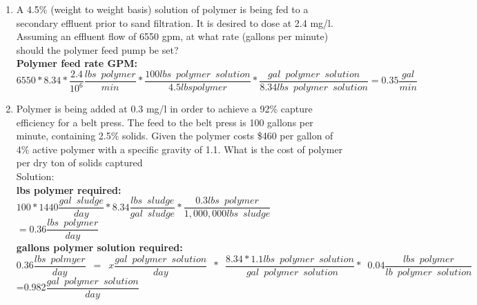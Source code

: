 \begin{enumerate}
\item A 4.5\% (weight to weight basis) solution of polymer is being fed to a secondary effluent prior to sand filtration. It is desired to dose at 2.4 mg/l. Assuming an effluent flow of 6550 gpm, at what rate (gallons per minute) should the polymer feed pump be set?\\
\vspace{0.25cm}
\textbf{Polymer feed rate GPM:}\\
$6550*8.34*\dfrac{2.4}{10^6}\dfrac{lbs \enspace polymer}{min}*
\dfrac{100lbs \enspace polymer \enspace solution}{4.5 lbs polymer}*
\dfrac{gal \enspace polymer \enspace solution}{8.34 lbs \enspace polymer \enspace solution}=\boxed{0.35\dfrac{gal}{min}}$
\pagebreak
\item Polymer is being added at 0.3 mg/l in order to achieve a 92\% capture efficiency for a belt press. The feed to the belt press is 100 gallons per minute, containing 2.5\% solids. Given the polymer costs \$460 per gallon of 4\% active polymer with a specific gravity of 1.1. What is the cost of polymer per dry ton of solids captured \\

Solution:\\
\textbf{lbs polymer required:}\\
$100*1440 \dfrac{gal \enspace sludge}{day}* 8.34 \dfrac{lbs \enspace sludge}{gal \enspace sludge} *\dfrac{0.3lbs \enspace polymer}{1,000,000 lbs \enspace sludge}$\\
\vspace{0.25cm}
$= 0.36 \dfrac{lbs \enspace polymer}{day}$\\

\vspace{0.25cm}
\textbf{gallons polymer solution required:}\\ $0.36 \dfrac{lbs \enspace polmyer}{day}\enspace=\enspace x \dfrac{gal \enspace polymer \enspace solution}{day} \enspace * \enspace \dfrac{8.34*1.1lbs \enspace polymer \enspace solution}{\enspace gal \enspace polymer \enspace solution}* \enspace 0.04 \dfrac{lbs \enspace polymer}{lb \enspace polymer \enspace solution}$\\
\vspace{0.25cm}
=0.982$\dfrac{gal \enspace polymer \enspace solution}{day}$
\vspace{0.25cm}


\end{enumerate}

